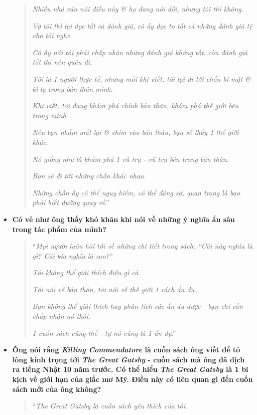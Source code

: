 \documentclass{article}
\begin{document}
\begin{itemize}
\begin{quotation}
		\textit{Nhiều nhà văn nói điều này \& họ đang nói dối, nhưng tôi thì không}.
		
		\textit{Vợ tôi thì lại đọc tất cả đánh giá, cô ấy đọc to tất cả những đánh giá tệ cho tôi nghe}.
		
		\textit{Cô ấy nói tôi phải chấp nhận những đánh giá không tốt, còn đánh giá tốt thì nên quên đi}.
		
		\textit{Tôi là 1 người thực tế, nhưng mỗi khi viết, tôi lại đi tới chốn bí mật \& kì lạ trong bản thân mình}.
		
		\textit{Khi viết, tôi đang khám phá chính bản thân, khám phá thế giới bên trong mình}.
		
		\textit{Nếu bạn nhắm mắt lại \& chìm vào bản thân, bạn sẽ thấy 1 thế giới khác}.
		
		\textit{Nó giống như là khám phá 1 vũ trụ - vũ trụ bên trong bản thân}.
		
		\textit{Bạn sẽ đi tới những chốn khác nhau}.
		
		\textit{Những chốn ấy có thể nguy hiểm, có thể đáng sợ, quan trọng là bạn phải biết đường quay về}.''
	\end{quotation}    
	
	\item \textbf{Có vẻ như ông thấy khó khăn khi nói về những ý nghĩa ẩn sâu trong tác phẩm của mình?}
	
	\begin{quotation}
		``\textit{Mọi người luôn hỏi tôi về những chi tiết trong sách: ``\emph{Cái này nghĩa là gì? Cái kia nghĩa là sao?}}''
		
		\textit{Tôi không thể giải thích điều gì cả}.
		
		\textit{Tôi nói về bản thân, tôi nói về thế giới 1 cách ẩn dụ}.
		
		\textit{Bạn không thể giải thích hay phân tích các ẩn dụ được - bạn chỉ cần chấp nhận nó thôi}.
		
		\textit{1 cuốn sách cũng thế - tự nó cũng là 1 ẩn dụ}.''
	\end{quotation}
	
	\item \textbf{Ông nói rằng \textit{Killing Commendatore} là cuốn sách ông viết để tỏ lòng kính trọng tới \textit{The Great Gatsby} - cuốn sách mà ông đã dịch ra tiếng Nhật 10 năm trước. Có thể hiểu \textit{The Great Gatsby} là 1 bi kịch về giới hạn của giấc mơ Mỹ. Điều này có liên quan gì đến cuốn sách mới của ông không?}
	
	\begin{quotation}
		``\textit{The Great Gatsby là cuốn sách yêu thích của tôi}.
		

\end{quotation}
\end{itemize}
\end{document}
